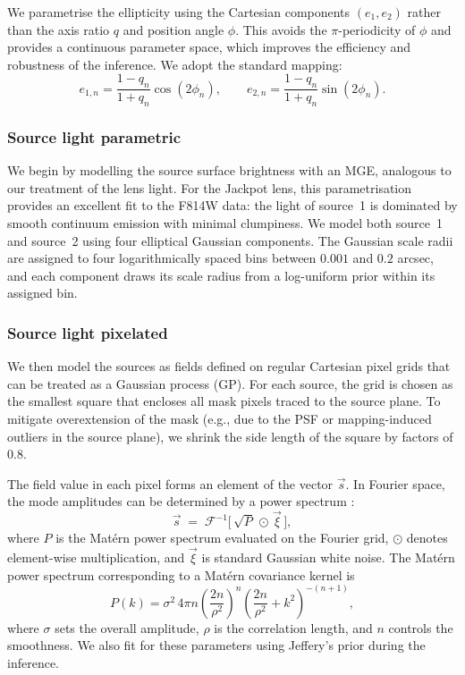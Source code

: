 \documentclass[fleqn,usenatbib]{mnras}
\begin{document}
We parametrise the ellipticity using the Cartesian components $(e_1,e_2)$ rather than the axis ratio $q$ and position angle $\phi$. This avoids the $\pi$-periodicity of $\phi$ and provides a continuous parameter space, which improves the efficiency and robustness of the inference. We adopt the standard mapping:
\begin{equation}
\label{eq:e1e2_def}
e_{1,n} = \frac{1-q_n}{1+q_n}\cos(2\phi_n), 
\qquad
e_{2,n} = \frac{1-q_n}{1+q_n}\sin(2\phi_n).
\end{equation}

\subsubsection{Source light parametric}

We begin by modelling the source surface brightness with an MGE, analogous to our treatment of the lens light. For the Jackpot lens, this parametrisation provides an excellent fit to the F814W data: the light of source~1 is dominated by smooth continuum emission with minimal clumpiness. We model both source~1 and source~2 using four elliptical Gaussian components. The Gaussian scale radii are assigned to four logarithmically spaced bins between $0.001$ and $0.2$ arcsec, and each component draws its scale radius from a log-uniform prior within its assigned bin.


\subsubsection{Source light pixelated}
We then model the sources as fields defined on regular Cartesian pixel grids that can be treated as a Gaussian process (GP). For each source, the grid is chosen as the smallest square that encloses all mask pixels traced to the source plane. To mitigate overextension of the mask (e.g., due to the PSF or mapping-induced outliers in the source plane), we shrink the side length of the square by factors of 0.8.

The field value in each pixel forms an element of the vector $\vec{s}$. In Fourier space, the mode amplitudes can be determined by a power spectrum \citep[see, e.g., ][]{Galan2024, RustigEtAl2024_LensCharm}:
\[
\vec{s} \;=\; \mathcal{F}^{-1}\!\big[\,\sqrt{P}\,\odot\,\vec{\xi}\,\big],
\]
where \(P\) is the Matérn power spectrum evaluated on the Fourier grid, 
\(\odot\) denotes element-wise multiplication, and $\vec{\xi}$ is standard Gaussian white noise. The Matérn power spectrum \citep[see e.g.][]{Stein2012Interpolation} corresponding to a Matérn covariance kernel is
\begin{equation}
P(k)=\sigma^{2}\,4\pi n\left(\frac{2n}{\rho^{2}}\right)^{n}\left(\frac{2n}{\rho^{2}}+k^{2}\right)^{-(n+1)},
\end{equation}
where $\sigma$ sets the overall amplitude, $\rho$ is the correlation length, and $n$ controls the smoothness. We also fit for these parameters using Jeffery's prior during the inference. 
\end{document}
